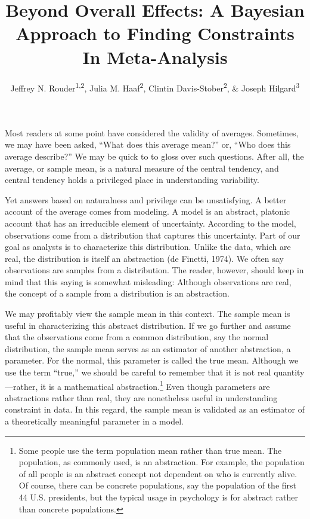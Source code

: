 \documentclass[english,man]{apa6}
\title{Beyond Overall Effects: A Bayesian Approach to Finding Constraints In
Meta-Analysis}
\author{Jeffrey N. Rouder\textsuperscript{1,2}, Julia M. Haaf\textsuperscript{2}, Clintin Davis-Stober\textsuperscript{2}, \& Joseph Hilgard\textsuperscript{3}}
\affiliation{
    \vspace{0.5cm}
          \textsuperscript{1} University of California, Irvine\\
          \textsuperscript{2} University of Missouri\\
          \textsuperscript{3} Illinois State University  }
\theoremstyle{definition}
\theoremstyle{definition}
\theoremstyle{definition}
\theoremstyle{remark}
\begin{document}
\maketitle

\setcounter{secnumdepth}{0}



Most readers at some point have considered the validity of averages.
Sometimes, we may have been asked, \enquote{What does this average
mean?} or, \enquote{Who does this average describe?} We may be quick to
to gloss over such questions. After all, the average, or sample mean, is
a natural measure of the central tendency, and central tendency holds a
privileged place in understanding variability.

Yet answers based on naturalness and privilege can be unsatisfying. A
better account of the average comes from modeling. A model is an
abstract, platonic account that has an irreducible element of
uncertainty. According to the model, observations come from a
distribution that captures this uncertainty. Part of our goal as
analysts is to characterize this distribution. Unlike the data, which
are real, the distribution is itself an abstraction (de Finetti, 1974).
We often say observations are samples from a distribution. The reader,
however, should keep in mind that this saying is somewhat misleading:
Although observations are real, the concept of a sample from a
distribution is an abstraction.

We may profitably view the sample mean in this context. The sample mean
is useful in characterizing this abstract distribution. If we go further
and assume that the observations come from a common distribution, say
the normal distribution, the sample mean serves as an estimator of
another abstraction, a parameter. For the normal, this parameter is
called the true mean. Although we use the term \enquote{true,} we should
be careful to remember that it is not real quantity---rather, it is a
mathematical abstraction.\footnote{Some people use the term population
  mean rather than true mean. The population, as commonly used, is an
  abstraction. For example, the population of all people is an abstract
  concept not dependent on who is currently alive. Of course, there can
  be concrete populations, say the population of the first 44 U.S.
  presidents, but the typical usage in psychology is for abstract rather
  than concrete populations.} Even though parameters are abstractions
rather than real, they are nonetheless useful in understanding
constraint in data. In this regard, the sample mean is validated as an
estimator of a theoretically meaningful parameter in a model.
\end{document}
